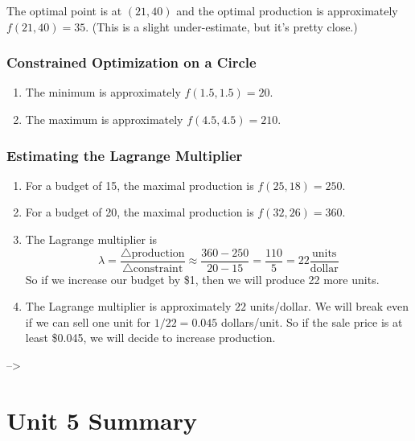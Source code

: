 \documentclass[
]{book}
\providecommand{\tightlist}{%
  \setlength{\itemsep}{0pt}\setlength{\parskip}{0pt}}
\begin{document}
The optimal point is at \((21,40)\) and the optimal production is approximately \(f(21,40)=35\). (This is a slight under-estimate, but it's pretty close.)

\hypertarget{constrained-optimization-on-a-circle-1}{%
\subsection{Constrained Optimization on a Circle}\label{constrained-optimization-on-a-circle-1}}

\begin{enumerate}
\def\labelenumi{\arabic{enumi}.}
\tightlist
\item
  The minimum is approximately \(f(1.5, 1.5) = 20\).
\item
  The maximum is approximately \(f(4.5, 4.5) = 210\).
\end{enumerate}

\hypertarget{estimating-the-lagrange-multiplier-1}{%
\subsection{Estimating the Lagrange Multiplier}\label{estimating-the-lagrange-multiplier-1}}

\begin{enumerate}
\def\labelenumi{\arabic{enumi}.}
\item
  For a budget of 15, the maximal production is \(f(25,18)=250\).
\item
  For a budget of 20, the maximal production is \(f(32,26)=360\).
\item
  The Lagrange multiplier is
  \[
  \lambda = \frac{\triangle \mbox{production}}{\triangle \mbox{constraint}} \approx \frac{360-250}{20-15}=\frac{110}{5}=22  \frac{\mbox{units}}{\mbox{dollar}}
  \]
  So if we increase our budget by \$1, then we will produce 22 more units.
\item
  The Lagrange multiplier is approximately \(22\) units/dollar. We will break even if we can sell one unit for \(1/22=0.045\) dollars/unit. So if the sale price is at least \$0.045, we will decide to increase production.
\end{enumerate}

--\textgreater{}

\hypertarget{unit-5-summary}{%
\chapter{Unit 5 Summary}\label{unit-5-summary}}
\end{document}

